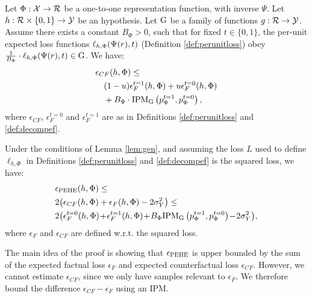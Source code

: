\begin{thmlem}\label{lem:gen}
Let $\Phi : \mathcal X \rightarrow \mathcal{R}$ be a one-to-one representation function, with inverse $\Psi$.
Let $h : \mathcal{R} \times \{0,1\} \rightarrow \mathcal Y$ be an hypothesis. Let $\mathrm{G}$ be a family of functions $g: \mathcal{R} \rightarrow \mathcal Y$. Assume there exists a constant $B_\Phi>0$, such that for fixed $t \in \{0,1\}$, the per-unit expected loss functions $\ell_{h,\Phi}(\Psi(r),t)$ (Definition \ref{def:perunitloss}) obey $ \frac{1}{B_\Phi} \cdot  \ell_{h,\Phi}(\Psi(r),t) \in \mathrm{G}$. We have:
\begin{align*}
&\epsilon_{CF}(h,\Phi) \leq \nonumber \\
&\quad (1-u)  \epsilon^{t=1}_F(h,\Phi) + u  \epsilon^{t=0}_F(h,\Phi) \nonumber \\
&  \quad + B_\Phi \cdot \text{IPM}_{\mathrm{G}}\left( p^{t=1}_\Phi, p^{t=0}_\Phi \right),
\end{align*}
where $\epsilon_{CF}$, $ \epsilon^{t=0}_F$ and $ \epsilon^{t=1}_F$ are as in Definitions \ref{def:perunitloss} and \ref{def:decompef}.
\end{thmlem}


\begin{thmthm}\label{thm:gen}
Under the conditions of Lemma \ref{lem:gen}, and assuming the loss $L$ used to define $\ell_{h,\Phi}$ in Definitions \ref{def:perunitloss} and \ref{def:decompef} is the squared loss, we have:
\begin{align}
&\epehe(h,\Phi) \leq  \nonumber \\
& 2\!\left(\epsilon_{CF}(h,\Phi) + \epsilon_F(h,\Phi) - 2\sigma^2_Y \right) \leq  \label{eq:thm_gen} \\
&2\!\left(\epsilon_F^{t=0}(h,\Phi)\! +\!\epsilon_F^{t=1}(h,\Phi)\!+ \! B_\Phi  \text{IPM}_\cF \left( \pt_\Phi, \pc_\Phi \right)\! -\! 2\sigma^2_Y\right)\!, \nonumber
\end{align}
where $\epsilon_F$ and $\epsilon_{CF}$ are defined w.r.t. the squared loss.
\end{thmthm}

The main idea of the proof is showing that $\epsilon_{\text{PEHE}}$ is upper bounded by the sum of the expected factual loss $\epsilon_F$ and expected counterfactual loss $\epsilon_{CF}$.  However, we cannot estimate $\epsilon_{CF}$, since we only have samples relevant to $\epsilon_F$.  We therefore bound the difference $\epsilon_{CF} - \epsilon_F$ using an IPM.



